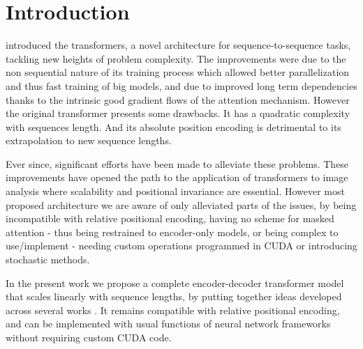 \section{\label{sec:introduction}Introduction}

\citet{vaswani2017attention} introduced the transformers, a novel architecture for sequence-to-sequence tasks, tackling new heights of problem complexity. The improvements were due to the non sequential nature of its training process which allowed better parallelization and thus fast training of big models, and due to improved long term dependencies thanks to the intrinsic good gradient flows of the attention mechanism. However the original transformer presents some drawbacks. It has a quadratic complexity with sequences length. And its absolute position encoding is detrimental to its extrapolation to new sequence lengths.

Ever since, significant efforts have been made to alleviate these problems. These improvements have opened the path to the application of transformers to image analysis where scalability and positional invariance are essential. However most proposed architecture we are aware of only alleviated parts of the issues, by being incompatible with relative positional encoding, having no scheme for masked attention - thus being restrained to encoder-only models, or being complex to use/implement - needing custom operations programmed in CUDA or introducing stochastic methods.

In the present work we propose a complete encoder-decoder transformer model that scales linearly with sequence lengths, by putting together ideas developed across several works \cite{vaswani2017attention,shen2020efficient,katharopoulos2020transformers,choromanski2021rethinking,shaw2018selfattention,horn2021translational}. It remains compatible with relative positional encoding, and can be implemented with usual functions of neural network frameworks without requiring custom CUDA code.

\endinput
